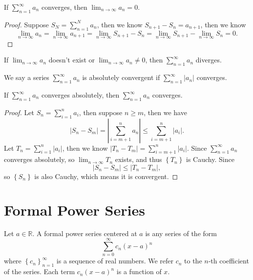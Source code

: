 \begin{theorem}
    If \(\sum_{n=1}^{\infty} a_n \) converges, then \(\lim_{n \to \infty} a_n = 0 \).   
\end{theorem}
\begin{proof}
    Suppose \(S_N = \sum_{n=1}^N a_n \), then we know \(S_{n+1} - S_n = a_{n+1}\), then we know 
    \[
        \lim_{n \to \infty} a_n = \lim_{n \to \infty} a_{n+1} = \lim_{n \to \infty} S_{n+1} - S_n = \lim_{n \to \infty} S_{n+1} - \lim_{n \to \infty} S_n = 0.    
    \]  
\end{proof}

\begin{corollary}
    If \(\lim_{n \to \infty} a_n \) doesn't exist or \(\lim_{n \to \infty} a_n \neq 0 \), then \(\sum_{n=1}^{\infty} a_n \) diverges.   
\end{corollary}

\begin{definition}
    We say a series \(\sum_{n=1}^{\infty} a_n  \) is absolutely convergent if \(\sum_{n=1}^{\infty} \vert a_n \vert  \) converges.
\end{definition}

\begin{theorem}
    If \(\sum_{n=1}^{\infty} a_n \) converges absolutely, then \(\sum_{n=1}^{\infty} a_n \) converges.
\end{theorem}
\begin{proof}
    Let \(S_n = \sum_{i=1}^n a_i \), then suppose \(n \ge m\), then we have 
    \[
        \left\vert S_n - S_m \right\vert = \left\vert \sum_{i=m+1}^{n} a_n \right\vert \le \sum_{i=m+1}^n \vert a_i \vert.    
    \]  
    Let \(T_n = \sum_{i=1}^n \vert a_i \vert  \), then we know \(\left\vert T_n - T_m \right\vert = \sum_{i=m+1}^n \vert a_i \vert  \). Since \(\sum_{n=1}^{\infty} a_n \) converges absolutely, so \(\lim_{n \to \infty} T_n \) exists, and thus \(\left\{ T_n \right\} \) is Cauchy. Since
    \[
        \left\vert S_n - S_m \right\vert \le \left\vert T_n - T_m \right\vert, 
    \] so \(\left\{ S_n \right\} \) is also Cauchy, which means it is convergent. 
\end{proof}

\section{Formal Power Series}
\begin{definition}
    Let \(a \in \mathbb{R} \). A formal power series centered at \(a\) is any series of the form 
    \[
        \sum_{n=0}^{\infty} c_n (x - a)^n 
    \] where \(\left\{ c_n \right\}_{n=1}^{\infty}  \) is a sequence of real numbers. We refer \(c_n\) to the \(n\)-th coefficient of the series. Each term \(c_n(x - a)^n\) is a function of \(x\).     
\end{definition}


